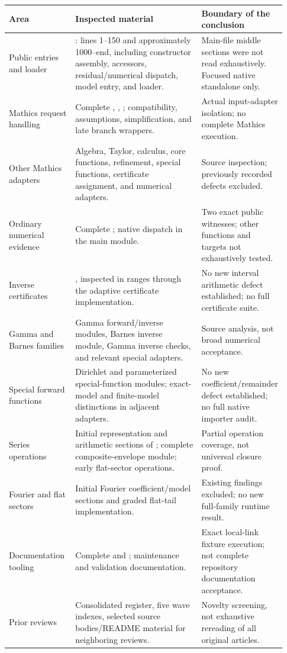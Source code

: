 \documentclass[11pt,letterpaper]{article}
\begin{document}
\small
\begin{longtable}{@{}P{0.24\linewidth}P{0.46\linewidth}P{0.23\linewidth}@{}}
\toprule
Area & Inspected material & Boundary of the conclusion\\
\midrule\endhead
Public entries and loader & : lines 1--150 and approximately 1000--end, including constructor assembly, accessors, residual/numerical dispatch, model entry, and loader. & Main-file middle sections were not read exhaustively. Focused native standalone only.\\
Mathics request handling & Complete , , ; compatibility, assumptions, simplification, and late branch wrappers. & Actual input-adapter isolation; no complete Mathics execution.\\
Other Mathics adapters & Algebra, Taylor, calculus, core functions, refinement, special functions, certificate assignment, and numerical adapters. & Source inspection; previously recorded defects excluded.\\
Ordinary numerical evidence & Complete ; native dispatch in the main module. & Two exact public witnesses; other functions and targets not exhaustively tested.\\
Inverse certificates & , inspected in ranges through the adaptive certificate implementation. & No new interval arithmetic defect established; no full certificate suite.\\
Gamma and Barnes families & Gamma forward/inverse modules, Barnes inverse module, Gamma inverse checks, and relevant special adapters. & Source analysis, not broad numerical acceptance.\\
Special forward functions & Dirichlet and parameterized special-function modules; exact-model and finite-model distinctions in adjacent adapters. & No new coefficient/remainder defect established; no full native importer audit.\\
Series operations & Initial representation and arithmetic sections of ; complete composite-envelope module; early flat-sector operations. & Partial operation coverage, not universal closure proof.\\
Fourier and flat sectors & Initial Fourier coefficient/model sections and graded flat-tail implementation. & Existing findings excluded; no new full-family runtime result.\\
Documentation tooling & Complete  and ; maintenance and validation documentation. & Exact local-link fixture execution; not complete repository documentation acceptance.\\
Prior reviews & Consolidated register, five wave indexes, selected source bodies/README material for neighboring reviews. & Novelty screening, not exhaustive rereading of all original articles.\\
\bottomrule
\end{longtable}
\normalsize
\end{document}
